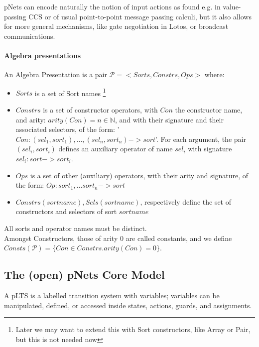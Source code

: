 \documentclass{lncs/llncs}
\newcommand{\QIN}[1]{\textcolor{airforceblue}{#1}}
\begin{document}
pNets can encode naturally the notion of input actions as found e.g. in value-passing CCS
\cite{Milner89} or of usual point-to-point message passing calculi, but it also allows
for more general mechanisms, like gate negotiation in Lotos, or broadcast
communications.
\QIN{
\paragraph*{Algebra presentations}
\begin{definition}
  An Algebra Presentation is a pair $\mathcal{P}=<Sorts,Constrs,Ops>$ where:
  \begin{itemize}
  \item $Sorts$ is a set of Sort names
    \footnote{Later we may want to extend this with Sort constructors,
      like Array or Pair, but this is not needed now}
  \item $Constrs$ is a set of constructor operators, with $Con$ the
    constructor name, and arity: $arity(Con)=n \in \mathbb{N}$,
    and with their signature and their associated selectors,
    of the form: '$Con : (sel_1,sort_1), ... , (sel_n,sort_n) -> sort$'.
    For each argument, the pair $(sel_i,sort_i)$ defines an auxiliary
    operator of name $sel_i$ with signature $sel_i : sort -> sort_i$.
    \item $Ops$ is a set of other (auxiliary) operators, with their
      arity and signature, of the form: $Op : sort_1, ...  sort_n ->
      sort$
      \item $Constrs(sortname), Sels(sortname)$, respectively define the set of
        constructors and selectors of sort $sortname$
  \end{itemize}
  All sorts and operator names must be distinct.\\
  Amongst Constructors, those of arity 0 are called constants, and we
  define $Consts(\mathcal{P}) = \{Con \in Constrs. arity(Con)=0\}$.
\end{definition}
}

\subsection{The (open) pNets Core Model}
\label{section:pNets}


A pLTS is a labelled transition system with variables; variables can be
manipulated, defined, or accessed inside states, actions, guards, and
assignments. 

\end{document}
